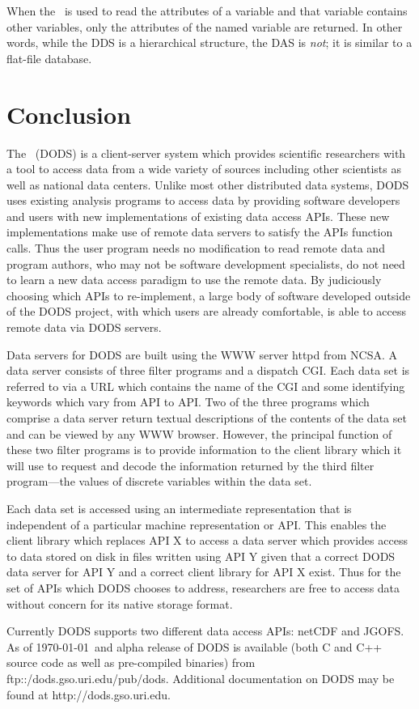 When the \dap\ is used to read the attributes of a variable and that variable
contains other variables, only the attributes of the named variable are
returned. In other words, while the DDS is a hierarchical structure, the DAS
is {\em not\/}; it is similar to a flat-file database.

\section {Conclusion}

The \DODS\ (DODS) is a client-server system which provides scientific
researchers with a tool to access data from a wide variety of sources
including other scientists as well as national data centers. Unlike most other
distributed data systems, DODS uses existing analysis programs to access data
by providing software developers and users with new implementations of
existing data access APIs. These new implementations make use of remote data
servers to satisfy the APIs function calls. Thus the user program needs no
modification to read remote data and program authors, who may not be software
development specialists, do not need to learn a new data access paradigm to
use the remote data. By judiciously choosing which APIs to re-implement,
a large body of software developed outside of the DODS project, with which
users are already comfortable, is able to access remote data via DODS
servers.

Data servers for DODS are built using the WWW server httpd from NCSA. A data
server consists of three filter programs and a dispatch CGI. Each data set is
referred to via a URL which contains the name of the CGI and some identifying
keywords which vary from API to API. Two of the three programs which comprise
a data server return textual descriptions of the contents of the data set and
can be viewed by any WWW browser. However, the principal function of these
two filter programs is to provide information to the client library which it
will use to request and decode the information returned by the third filter
program---the values of discrete variables within the data set.

Each data set is accessed using an intermediate representation that is
independent of a particular machine representation or API. This enables the
client library which replaces API X to access a data server which provides
access to data stored on disk in files written using API Y given that a
correct DODS data server for API Y and a correct client library for API X
exist. Thus for the set of APIs which DODS chooses to address,
researchers are free to access data without concern for its native storage
format. 

Currently DODS supports two different data access APIs: netCDF and JGOFS. As
of \today\ and alpha release of DODS is available (both C and C++ source code
as well as pre-compiled binaries) from
ftp::/dods.gso.uri.edu/pub/dods. Additional documentation on DODS may be
found at http://dods.gso.uri.edu.





